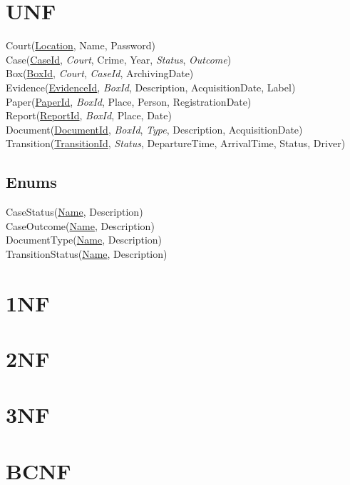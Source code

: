\documentclass{article}
\begin{document}
\section{UNF}

Court(\underline{Location}, Name, Password) \\
Case(\underline{CaseId}, \textit{Court}, Crime, Year, \textit{Status}, \textit{Outcome}) \\
Box(\underline{BoxId}, \textit{Court}, \textit{CaseId}, ArchivingDate) \\
Evidence(\underline{EvidenceId}, \textit{BoxId}, Description, AcquisitionDate, Label) \\
Paper(\underline{PaperId}, \textit{BoxId}, Place, Person, RegistrationDate) \\
Report(\underline{ReportId}, \textit{BoxId}, Place, Date) \\
Document(\underline{DocumentId}, \textit{BoxId}, \textit{Type}, Description, AcquisitionDate) \\
Transition(\underline{TransitionId}, \textit{Status}, DepartureTime, ArrivalTime, Status, Driver)

\subsection{Enums}
CaseStatus(\underline{Name}, Description) \\
CaseOutcome(\underline{Name}, Description) \\
DocumentType(\underline{Name}, Description) \\
TransitionStatus(\underline{Name}, Description)

\section{1NF}
\section{2NF}
\section{3NF}
\section{BCNF}
\end{document}
